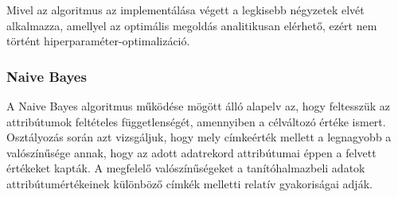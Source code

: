 \documentclass[12pt]{article}
\DeclareMathOperator*{\argmax}{arg\,max}
\begin{document}
Mivel az algoritmus az implementálása végett a legkisebb négyzetek elvét alkalmazza, amellyel az optimális megoldás analitikusan elérhető, ezért nem történt hiperparaméter-optimalizáció.

\subsubsection{Naive Bayes}

%
%


A Naive Bayes algoritmus működése mögött álló alapelv az, hogy feltesszük az attribútumok feltételes függetlenségét, amennyiben a célváltozó értéke ismert. Osztályozás során azt vizsgáljuk, hogy mely címkeérték mellett a legnagyobb a valószínűsége annak, hogy az adott adatrekord attribútumai éppen a felvett értékeket kapták. A megfelelő valószínűségeket a tanítóhalmazbeli adatok attribútumértékeinek különböző címkék melletti relatív gyakoriságai adják. 
\end{document}
